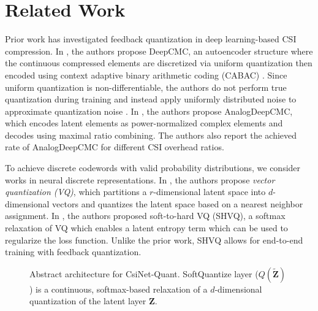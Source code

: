 \section{Related Work}

Prior work has investigated feedback quantization in deep learning-based CSI compression. In \cite{ref:Yang2019DeepCMC}, the authors propose DeepCMC, an autoencoder structure where the continuous compressed elements are discretized via uniform quantization then encoded using context adaptive binary arithmetic coding (CABAC) \cite{ref:Marpe2003CABAC}. Since uniform quantization is non-differentiable, the authors do not perform true quantization during training and instead apply uniformly distributed noise to approximate quantization noise \cite{ref:Yang2019DeepCMC}. In \cite{ref:Mashhadi2020AnalogDeepCMC}, the authors propose AnalogDeepCMC, which encodes latent elements as power-normalized complex elements and decodes using maximal ratio combining. The authors also report the achieved rate of AnalogDeepCMC for different CSI overhead ratios.

To achieve discrete codewords with valid probability distributions, we consider works in neural discrete representations. In \cite{ref:Oord2017Neural}, the authors propose \emph{vector quantization (VQ)}, which partitions a $r$-dimensional latent space into $d$-dimensional vectors and quantizes the latent space based on a nearest neighbor assignment. In \cite{ref:Agustsson2017SoftToHard}, the authors proposed soft-to-hard VQ (SHVQ), a softmax relaxation of VQ which enables a latent entropy term which can be used to regularize the loss function.  Unlike the prior work, SHVQ allows for end-to-end training with feedback quantization.

\begin{figure}[!hbtp]
\centering
\def\svgwidth{0.8\columnwidth}

\caption{Abstract architecture for CsiNet-Quant. SoftQuantize layer ($Q(\tilde{\mathbf Z})$) is a continuous, softmax-based relaxation of a $d$-dimensional quantization of the latent layer $\mathbf Z$.}
\label{fig:csinet_quant}
\end{figure}

